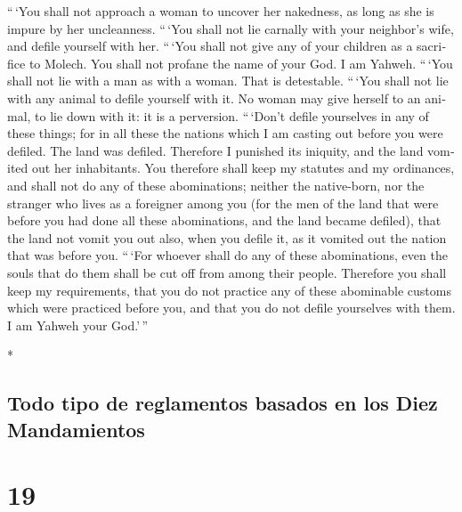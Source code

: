 \begin{paracol}{2}
\begin{otherlanguage}{english}
 ``\,`You shall not approach a woman to uncover her
nakedness, as long as she is impure by her uncleanness. 
``\,`You shall not lie carnally with your neighbor's wife, and defile
yourself with her.  ``\,`You shall not give any of your
children as a sacrifice to Molech. You shall not profane the name of
your God. I am Yahweh.  ``\,`You shall not lie with a man
as with a woman. That is detestable.  ``\,`You shall not
lie with any animal to defile yourself with it. No woman may give
herself to an animal, to lie down with it: it is a perversion.
 ``\,`Don't defile yourselves in any of these things; for
in all these the nations which I am casting out before you were defiled.
 The land was defiled. Therefore I punished its iniquity,
and the land vomited out her inhabitants.  You therefore
shall keep my statutes and my ordinances, and shall not do any of these
abominations; neither the native-born, nor the stranger who lives as a
foreigner among you  (for the men of the land that were
before you had done all these abominations, and the land became
defiled),  that the land not vomit you out also, when you
defile it, as it vomited out the nation that was before you.
 ``\,`For whoever shall do any of these abominations,
even the souls that do them shall be cut off from among their people.
 Therefore you shall keep my requirements, that you do
not practice any of these abominable customs which were practiced before
you, and that you do not defile yourselves with them. I am Yahweh your
God.'\,''

\end{otherlanguage}

\switchcolumn[0]*

\hypertarget{todo-tipo-de-reglamentos-basados-en-los-diez-mandamientos}{%
\subsection{Todo tipo de reglamentos basados \hspace{0pt}\hspace{0pt}en
los Diez
Mandamientos}\label{todo-tipo-de-reglamentos-basados-en-los-diez-mandamientos}}

\hypertarget{section-36}{%
\section{19}\label{section-36}}


\end{paracol}
